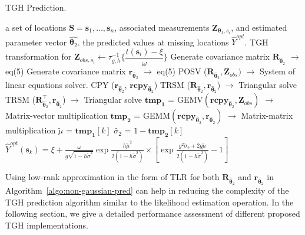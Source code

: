\documentclass[conference]{IEEEtran}
\begin{document}
\begin{algorithm}[H]
\footnotesize
\caption{TGH Prediction.}
\label{algo:non-gaussian-pred}
\begin{algorithmic}[1]
 a set of locations $\bm{S} = \bm s_1,\ldots,\bm s_n$,   associated measurements $\bm{Z}_{\bm{\theta}_1,s_i}$, and estimated parameter vector $\widehat{\bm{\theta}_2}$.
 the predicted values at missing locations $\widehat{Y}^{opt}$.
\STATE TGH transformation for $\bm{Z}_{obs,s_i} \leftarrow \tau_{g,h}^{-1} \bigg \{ \dfrac{t(\bm{s}_i) - \xi}{\omega} \bigg \}$
\STATE  Generate covariance matrix $\bm{R}_{\widehat{\bm{\theta}}_2}$ $\rightarrow$ eq(5)
    \STATE Generate covariance matrix $\bm{r}_{\widehat{\bm{\theta}}_2}$  $\rightarrow$ eq(5)
\STATE  POSV ($\bm{R}_{\widehat{\bm{\theta}}_2}, \bm{Z}_{obs})$ $\rightarrow$ System of linear equations solver.
        \STATE CPY ($\bm{r}_{\widehat{\bm{\theta}}_2}$, $\bm{rcpy}_{\widehat{\bm{\theta}}_2}$) 
    \STATE TRSM ($\bm{R}_{\widehat{\bm{\theta}}_2}, \bm{r}_{\widehat{\bm{\theta}}_2}$) $\rightarrow$ Triangular solve
        \STATE TRSM ($\bm{R}_{\widehat{\bm{\theta}}_2}^\top, \bm{r}_{\widehat{\bm{\theta}}_2}$) $\rightarrow$ Triangular solve
                \STATE $\bm{tmp_1}$ = GEMV$(\bm{rcpy}_{\widehat{\bm{\theta}}_2}, \bm{Z}_{obs})$ $\rightarrow$ Matrix-vector multiplication 
                \STATE $\bm{tmp_2}$ = GEMM$ (\bm{rcpy}_{\widehat{\bm{\theta}}_2}, \bm{r}_{\widehat{\bm{\theta}}_2})$ $\rightarrow$ Matrix-matrix multiplication 
                \STATE $\tilde{\mu}$ =  $\bm{tmp_1}[k]$
        \STATE $\tilde{\sigma_2}$ = $1-\bm{tmp_2}[k]$
        \STATE $\widehat{Y}^{opt}(\bm{s}_k)=\xi +  \frac{\omega}{g\sqrt{1-h\tilde{\sigma}^2}} \exp{\frac{h\tilde{\mu}^2}{2(1-h\tilde{\sigma}^2)}}      \times [\exp{\frac{g^2\tilde{\sigma}_2+2g\tilde{\mu}}{2(1-h\tilde{\sigma}^2)}-1}] $
  \ENDFOR
\end{algorithmic}
\end{algorithm}


Using low-rank approximation in the form of TLR for both $\bm{R}_{\widehat{\bm{\theta}}_2}$ and $\bm{r}_{\widehat{\bm{\theta}}_2}$  in
 Algorithm~\ref{algo:non-gaussian-pred} can help
in reducing the complexity of the TGH prediction algorithm
similar to the likelihood estimation operation. In the following
section, we give a detailed performance assessment of different
proposed TGH implementations.
\end{document}
